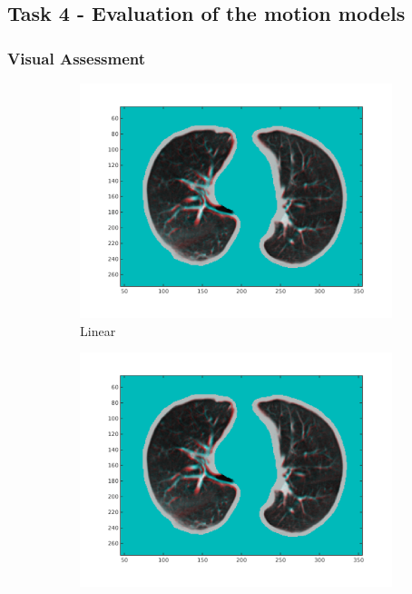 \documentclass[11pt,a4paper,oneside]{report}
\begin{document}
\subsection*{Task 4 - Evaluation of the motion models}

\subsubsection*{Visual Assessment}

\begin{figure}[H]
  \centering
  \hspace*{-2em}
  \begin{subfigure}[b]{0.33\textwidth}
    \includegraphics[width=\textwidth, trim=0 50 0 0,clip=true]{figures/task4/visAss_m1.png}
    \caption{Linear}
  \end{subfigure}%
  \begin{subfigure}[b]{0.33\textwidth}
    \includegraphics[width=\textwidth, trim=0 50 0 0,clip=true]{figures/task4/visAss_m1.png}

\end{subfigure}
\end{figure}
\end{document}
